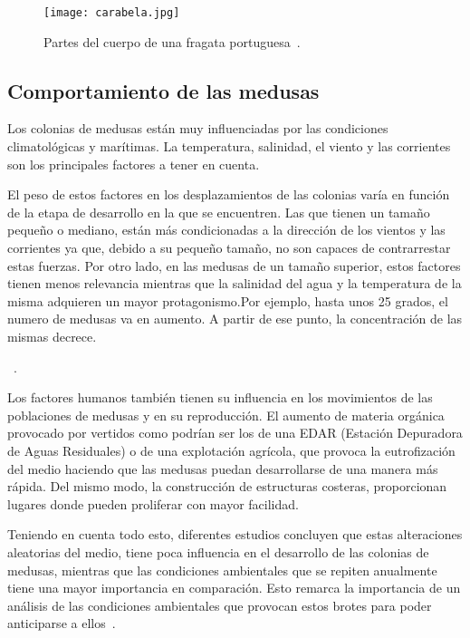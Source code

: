 \begin{figure}%
	\centering
	\texttt{[image: carabela.jpg]}
	\caption[Partes del cuerpo de una fragata portuguesa]{Partes del cuerpo de una fragata portuguesa~\cite{esquema-carabela}.}
	\label{esquema_carabela}
\end{figure}

\subsection{Comportamiento de las medusas}
Los colonias de medusas están muy influenciadas por las condiciones climatológicas y marítimas. La temperatura, salinidad, el viento y las corrientes son los principales factores a tener en cuenta.

El peso de estos factores en los desplazamientos de las colonias varía en función de la etapa de desarrollo en la que se encuentren. Las que tienen un tamaño pequeño o mediano, están más condicionadas a la dirección de los vientos y las corrientes ya que, debido a su pequeño tamaño, no son capaces de contrarrestar estas fuerzas. Por otro lado, en las medusas de un tamaño superior, estos factores tienen menos relevancia mientras que la salinidad del agua y la temperatura de la misma adquieren un mayor protagonismo.Por ejemplo, hasta unos 25 grados, \texttt{}el numero de medusas va en aumento. A partir de ese punto, la concentración de las mismas decrece.

\textit{}~\cite{canepa_environmental_2017}. 

Los factores humanos también tienen su influencia en los movimientos de las poblaciones de medusas y en su reproducción. 
El aumento de materia orgánica provocado por vertidos como podrían ser los de una EDAR (Estación Depuradora de Aguas Residuales) o de una explotación agrícola, que provoca la eutrofización del medio haciendo que las medusas puedan desarrollarse de una manera más rápida. Del mismo modo, la construcción de estructuras costeras, proporcionan lugares donde pueden proliferar con mayor facilidad.

Teniendo en cuenta todo esto, diferentes estudios concluyen que estas alteraciones aleatorias del medio, tiene poca influencia en el desarrollo de las colonias de medusas, mientras que las condiciones ambientales que se repiten anualmente tiene una mayor importancia en comparación. Esto remarca la importancia de un análisis de las condiciones ambientales que provocan estos brotes para poder anticiparse a ellos~\cite{art:ArticuloCanepa_1}.

